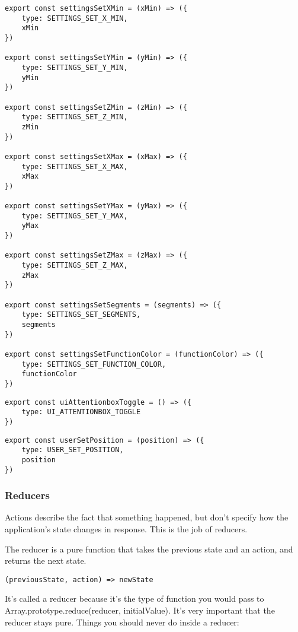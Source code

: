 \begin{lstlisting}
export const settingsSetXMin = (xMin) => ({
    type: SETTINGS_SET_X_MIN,
    xMin
})

export const settingsSetYMin = (yMin) => ({
    type: SETTINGS_SET_Y_MIN,
    yMin
})

export const settingsSetZMin = (zMin) => ({
    type: SETTINGS_SET_Z_MIN,
    zMin
})

export const settingsSetXMax = (xMax) => ({
    type: SETTINGS_SET_X_MAX,
    xMax
})

export const settingsSetYMax = (yMax) => ({
    type: SETTINGS_SET_Y_MAX,
    yMax
})

export const settingsSetZMax = (zMax) => ({
    type: SETTINGS_SET_Z_MAX,
    zMax
})

export const settingsSetSegments = (segments) => ({
    type: SETTINGS_SET_SEGMENTS,
    segments
})

export const settingsSetFunctionColor = (functionColor) => ({
    type: SETTINGS_SET_FUNCTION_COLOR,
    functionColor
})
\end{lstlisting}


\begin{lstlisting}
export const uiAttentionboxToggle = () => ({
    type: UI_ATTENTIONBOX_TOGGLE
})
\end{lstlisting}


\begin{lstlisting}
export const userSetPosition = (position) => ({
    type: USER_SET_POSITION,
    position
})
\end{lstlisting}

\subsubsection{Reducers}
Actions describe the fact that something happened, but don't specify how the application's state changes in response. This is the job of reducers.

The reducer is a pure function that takes the previous state and an action, and returns the next state.


\begin{lstlisting}
(previousState, action) => newState
\end{lstlisting}

It's called a reducer because it's the type of function you would pass to Array.prototype.reduce(reducer, initialValue). It's very important that the reducer stays pure. Things you should never do inside a reducer:

